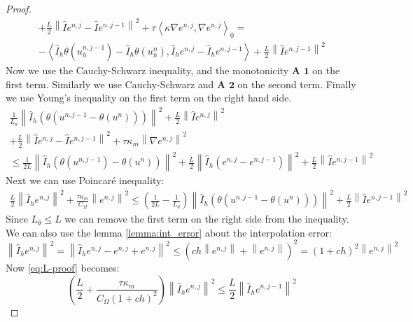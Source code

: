 \documentclass[../Main/main.tex]{subfiles}
\begin{document}
\begin{proof}
\begin{equation}
\begin{gathered}
				 + \frac{L}{2}\left \| \hat{I} e^{n,j}-\hat{I}e^{n,j-1} \right \|^2 + 
				\tau \left \langle \kappa\nabla e^{n,j},\nabla e^{n,j} \right \rangle_0  = \\ - \left \langle \hat{I}_h \theta(u^{n,j-1}_h) - \hat{I}_h \theta(u^{n}_h),\hat{I}_h e^{n,j} - \hat{I}_h e^{n,j-1}\right \rangle+\frac{L}{2}\left \| \hat{I} e^{n,j-1}\right \|^2
			\end{gathered}
		\end{equation}
		Now we use the Cauchy-Schwarz inequality, and the monotonicity $\textbf{A 1}$ on the first term. Similarly we use Cauchy-Schwarz and $\textbf{A 2}$ on the second term. Finally we use Young's inequality on the first term on the right hand side.
		\begin{equation}
			\begin{gathered}
				\frac{1}{L_{\theta}}\left \| \hat{I}_h (\theta(u^{n,j-1}-\theta(u^{n}))) \right \|^2 + \frac{L}{2}\left \| \hat{I} e^{n,j}\right \|^2 \\
				+ \frac{L}{2}\left \| \hat{I} e^{n,j}-\hat{I}e^{n,j-1} \right \|^2 + \tau \kappa_m \left \| \nabla e^{n,j} \right \|^2 \\
				\leq \frac{1}{2L} \left \| \hat{I}_h(\theta (u^{n,j-1})-\theta (u^n) ) \right \|^2  + \frac{L}{2} \left \|\hat{I}_h( e^{n,j} - e^{n,j-1}) \right \|^2+\frac{L}{2}\left \| \hat{I} e^{n,j-1}\right \|^2
			\end{gathered}
		\end{equation} 
		Next we can use Poincaré inequality:
		\begin{equation}\label{eq:L-proof}
			\begin{gathered}
				\frac{L}{2}\left \| \hat{I}_h e^{n,j}\right\|^2 + \frac{\tau \kappa_m}{C_{\Omega}} \left \|e^{n,j} \right \|^2 \leq (\frac{1}{2L} - \frac{1}{L_{\theta}}) \left \| \hat{I}_h(\theta (u^{n,j-1}-\theta (u^n))) \right \|^2 +\frac{L}{2}\left \| \hat{I} e^{n,j-1}\right \|^2
			\end{gathered}
		\end{equation}
		Since $L_{\theta} \leq L$ we can remove the first term on the right side from the inequality. We can also use the lemma \ref{lemma:int_error} about the interpolation error:
		\begin{equation}
			\left \| \hat{I}_h e^{n,j} \right \|^2 = \left \| \hat{I}_h e^{n,j} - e^{n,j} + e^{n,j} \right \|^2 \leq (ch\left \| e^{n,j}\right \| + \left \| e^{n,j} \right \|)^2=(1+ch)^2\left \| e^{n,j} \right \|^2
		\end{equation}
		Now \eqref{eq:L-proof} becomes:
		\begin{equation}
			(\frac{L}{2}+\frac{\tau \kappa_m }{C_{\Omega}(1 + ch)^2})\left \| \hat{I}_h e^{n,j} \right \|^2 \leq \frac{L}{2} \left \| \hat{I}_h e^{n,j-1}\right \|^2
		\end{equation}
	\end{proof}
	
\end{document}
